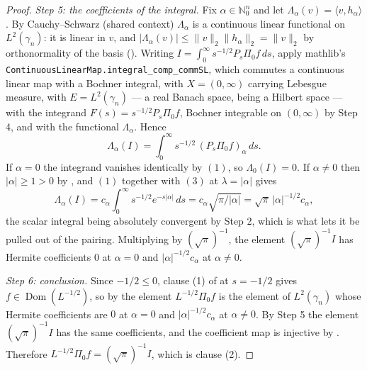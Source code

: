 \begin{proof}
\emph{Step 5: the coefficients of the integral.}
Fix $\alpha \in \mathbb{N}_0^n$ and let $\Lambda_\alpha(v) = \langle v,h_\alpha\rangle$.
By Cauchy--Schwarz (shared context) $\Lambda_\alpha$ is a continuous linear
functional on $L^2(\gamma_n)$: it is linear in $v$, and
$|\Lambda_\alpha(v)| \leq \|v\|_2\|h_\alpha\|_2 = \|v\|_2$ by orthonormality of
the basis ().  Writing
$I = \int_0^\infty s^{-1/2}P_s\Pi_0f\,ds$, apply mathlib's
\texttt{ContinuousLinearMap.integral\_comp\_commSL}, which commutes a continuous
linear map with a Bochner integral, with $X = (0,\infty)$ carrying Lebesgue
measure, with $E = L^2(\gamma_n)$ --- a real Banach space, being a Hilbert
space --- with the integrand $F(s) = s^{-1/2}P_s\Pi_0f$, Bochner integrable on
$(0,\infty)$ by Step 4, and with the functional $\Lambda_\alpha$.  Hence
\[
  \Lambda_\alpha(I) = \int_0^\infty s^{-1/2}\,(P_s\Pi_0f)_\alpha \, ds .
\]
If $\alpha = 0$ the integrand vanishes identically by $(1)$, so
$\Lambda_0(I) = 0$.  If $\alpha \neq 0$ then $|\alpha| \geq 1 > 0$ by
, and $(1)$ together with $(3)$ at
$\lambda = |\alpha|$ gives
\[
  \Lambda_\alpha(I) = c_\alpha\int_0^\infty s^{-1/2}e^{-s|\alpha|}\,ds
    = c_\alpha\sqrt{\pi/|\alpha|} = \sqrt\pi\,|\alpha|^{-1/2}c_\alpha ,
\]
the scalar integral being absolutely convergent by Step 2, which is what lets it
be pulled out of the pairing.  Multiplying by $(\sqrt\pi)^{-1}$, the element
$(\sqrt\pi)^{-1}I$ has Hermite coefficients $0$ at $\alpha = 0$ and
$|\alpha|^{-1/2}c_\alpha$ at $\alpha \neq 0$.

\emph{Step 6: conclusion.}
Since $-1/2 \leq 0$, clause (1) of  at $s = -1/2$ gives
$f \in \operatorname{Dom}(L^{-1/2})$, so by  the element
$L^{-1/2}\Pi_0 f$ is the element of $L^2(\gamma_n)$ whose Hermite coefficients
are $0$ at $\alpha = 0$ and $|\alpha|^{-1/2}c_\alpha$ at $\alpha \neq 0$.  By
Step 5 the element $(\sqrt\pi)^{-1}I$ has the same coefficients, and the
coefficient map is injective by .  Therefore
$L^{-1/2}\Pi_0 f = (\sqrt\pi)^{-1}I$, which is clause (2).
\end{proof}
